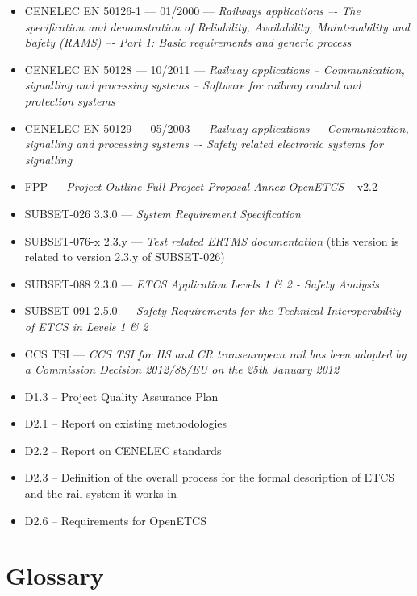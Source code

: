 \begin{itemize}
\item CENELEC EN 50126-1 --- 01/2000 --- \emph{Railways applications –- The specification and 
demonstration of Reliability, Availability, Maintenability and Safety (RAMS) –- Part 1: 
Basic requirements and generic process}
\item CENELEC EN 50128 --- 10/2011 --- \emph{Railway applications -- Communication, signalling and 
processing systems -- Software for railway control and protection systems}
\item CENELEC EN 50129 --- 05/2003 --- \emph{Railway applications –- Communication, signalling and 
processing systems –- Safety related electronic systems for signalling}
\item FPP --- \emph{Project Outline Full Project Proposal Annex OpenETCS} -- v2.2
\item SUBSET-026 3.3.0 --- \emph{System Requirement Specification}
\item SUBSET-076-x 2.3.y --- \emph{Test related ERTMS documentation} (this version is related to version 2.3.y  of SUBSET-026)
\item SUBSET-088 2.3.0 --- \emph{ETCS Application Levels 1 \& 2 - Safety Analysis}
\item SUBSET-091 2.5.0 --- \emph{Safety Requirements for the Technical Interoperability
of ETCS in Levels 1 \& 2}
\item CCS TSI --- \emph{ CCS TSI for HS and CR transeuropean rail has been adopted by a Commission Decision 2012/88/EU on the 25th January 2012}
\item D1.3 -- Project Quality Assurance Plan
\item D2.1 -- Report on existing methodologies 
\item D2.2 -- Report on CENELEC standards
\item D2.3 -- Definition of the overall process for the formal description of ETCS and the rail system it works in 
\item D2.6 -- Requirements for OpenETCS
\end{itemize}



\section{Glossary}
\label{sec:glossary}

